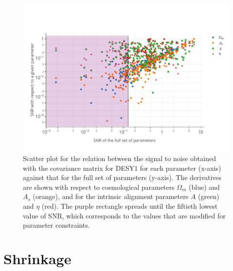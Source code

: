\documentclass[twocolumn]{\docclass}
\begin{document}
	\begin{figure}
		\includegraphics[width=1\columnwidth]{SNR/SNR_cuts.pdf}
		\caption{Scatter plot for the relation between the signal to noise obtained with the covariance matrix for DESY1 for each parameter (x-axis) against that for the full set of parameters (y-axis). The derivatives are shown with respect to cosmological parameters $\Omega_m$ (blue) and $A_s$ (orange), and for the intrinsic alignment parameters $A$ (green) and $\eta$ (red). The purple rectangle spreads until the fiftieth lowest value of SNR, which corresponds to the values that are modified for parameter constraints. \label{fig:signalnoise_cuts}}
	\end{figure}
	

	
	\section{Shrinkage}
	\label{subsec:shrinkage}
	
	
\end{document}
